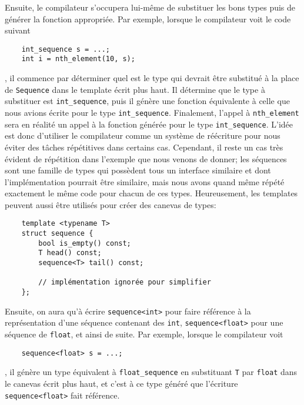 Ensuite, le compilateur s'occupera lui-même de substituer les bons types puis
de générer la fonction appropriée. Par exemple, lorsque le compilateur voit le
code suivant
\begin{verbatim}
    int_sequence s = ...;
    int i = nth_element(10, s);
\end{verbatim}

, il commence par déterminer quel est le type qui devrait être substitué à
la place de {\tt Sequence} dans le template écrit plus haut. Il détermine
que le type à substituer est {\tt int\_sequence}, puis il génère une fonction
équivalente à celle que nous avions écrite pour le type {\tt int\_sequence}.
Finalement, l'appel à {\tt nth\_element} sera en réalité un appel à la
fonction générée pour le type {\tt int\_sequence}. L'idée est donc
d'utiliser le compilateur comme un système de réécriture pour nous
éviter des tâches répétitives dans certains cas. Cependant, il reste un cas
très évident de répétition dans l'exemple que nous venons de donner; les
séquences sont une famille de types qui possèdent tous un interface similaire
et dont l'implémentation pourrait être similaire, mais nous avons quand même
répété exactement le même code pour chacun de ces types. Heureusement, les
templates peuvent aussi être utilisés pour créer des canevas de types:
\begin{verbatim}
    template <typename T>
    struct sequence {
        bool is_empty() const;
        T head() const;
        sequence<T> tail() const;

        // implémentation ignorée pour simplifier
    };
\end{verbatim}

Ensuite, on aura qu'à écrire {\tt sequence<int>} pour faire référence à la
représentation d'une séquence contenant des {\tt int}, {\tt sequence<float>}
pour une séquence de {\tt float}, et ainsi de suite. Par exemple, lorsque le
compilateur voit
\begin{verbatim}
    sequence<float> s = ...;
\end{verbatim}

, il génère un type équivalent à {\tt float\_sequence} en substituant {\tt T}
par {\tt float} dans le canevas écrit plus haut, et c'est à ce type généré que
l'écriture {\tt sequence<float>} fait référence.

